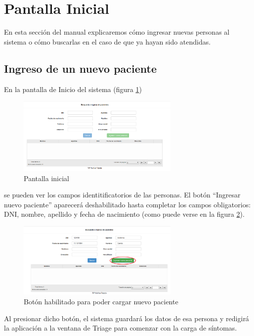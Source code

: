 \section{Pantalla Inicial}
En esta sección del manual explicaremos cómo ingresar nuevas personas al sistema o cómo buscarlas en el caso de que ya hayan sido atendidas.

\subsection{Ingreso de un nuevo paciente}
En la pantalla de Inicio del sistema (figura \ref{fig:inicio}) 
\begin{figure}
\centerline{\includegraphics[width=0.7\textwidth]{inicio.png}}
\caption{Pantalla inicial} \label{fig:inicio}
\end{figure}
se pueden ver los campos identitificatorios de las personas. El botón ``Ingresar nuevo paciente'' aparecerá deshabilitado hasta completar los campos obligatorios: DNI, nombre, apellido y fecha de nacimiento (como puede verse en la figura \ref{fig:inicio_nuevo}).
\begin{figure}
\centerline{\includegraphics[width=0.7\textwidth]{inicio_nuevo.png}}
\caption{Botón habilitado para poder cargar nuevo paciente} \label{fig:inicio_nuevo}
\end{figure}
Al presionar dicho botón, el sistema guardará los datos de esa persona y redigirá la aplicación a la ventana de Triage para comenzar con la carga de síntomas.

